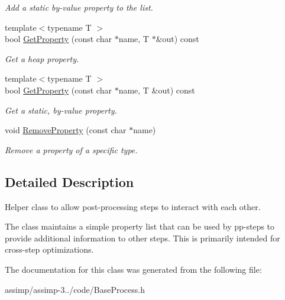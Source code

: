 \begin{DoxyCompactItemize}
\begin{DoxyCompactList}\small\item\em Add a static by-\/value property to the list. \end{DoxyCompactList}\item 
\hypertarget{class_assimp_1_1_shared_post_process_info_a94ff656ee1eb86ef103f79e5ffc256fa}{{\footnotesize template$<$typename T $>$ }\\bool \hyperlink{class_assimp_1_1_shared_post_process_info_a94ff656ee1eb86ef103f79e5ffc256fa}{Get\+Property} (const char $\ast$name, T $\ast$\&out) const }\label{class_assimp_1_1_shared_post_process_info_a94ff656ee1eb86ef103f79e5ffc256fa}

\begin{DoxyCompactList}\small\item\em Get a heap property. \end{DoxyCompactList}\item 
\hypertarget{class_assimp_1_1_shared_post_process_info_a469056d58e0cb598518c4051d600698a}{{\footnotesize template$<$typename T $>$ }\\bool \hyperlink{class_assimp_1_1_shared_post_process_info_a469056d58e0cb598518c4051d600698a}{Get\+Property} (const char $\ast$name, T \&out) const }\label{class_assimp_1_1_shared_post_process_info_a469056d58e0cb598518c4051d600698a}

\begin{DoxyCompactList}\small\item\em Get a static, by-\/value property. \end{DoxyCompactList}\item 
\hypertarget{class_assimp_1_1_shared_post_process_info_ae29aedfb4b675f3b8f352ee881af1b36}{void \hyperlink{class_assimp_1_1_shared_post_process_info_ae29aedfb4b675f3b8f352ee881af1b36}{Remove\+Property} (const char $\ast$name)}\label{class_assimp_1_1_shared_post_process_info_ae29aedfb4b675f3b8f352ee881af1b36}

\begin{DoxyCompactList}\small\item\em Remove a property of a specific type. \end{DoxyCompactList}\end{DoxyCompactItemize}


\subsection{Detailed Description}
Helper class to allow post-\/processing steps to interact with each other.

The class maintains a simple property list that can be used by pp-\/steps to provide additional information to other steps. This is primarily intended for cross-\/step optimizations. 

The documentation for this class was generated from the following file\+:\begin{DoxyCompactItemize}
\item 
assimp/assimp-\/3../code/Base\+Process.\+h\end{DoxyCompactItemize}
